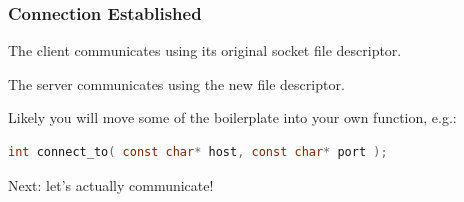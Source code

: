 \begin{frame}[fragile]
\frametitle{Connection Established}

The client communicates using its original socket file descriptor. 

The server communicates using the new file descriptor.

Likely you will move some of the boilerplate into your own function, e.g.:

\begin{lstlisting}[language=C]
int connect_to( const char* host, const char* port ); 
\end{lstlisting}

Next: let's actually communicate!

\end{frame}




